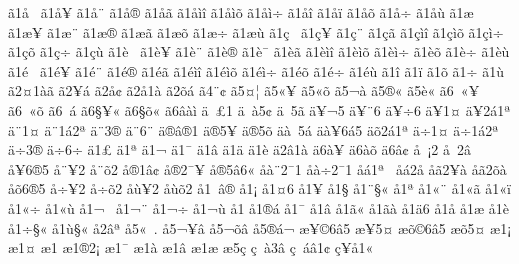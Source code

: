 {^^e31^^e5^^a0
^^e31^^e5^^a5
^^e31^^e5^^a8
^^e31^^e5^^ae
^^e31^^e5^^e3
^^e31^^e5^^ec^^ee
^^e31^^e5^^ec^^f5
^^e31^^e5^^ec^^f7
^^e31^^e5^^ee
^^e31^^e5^^ef
^^e31^^e5^^f5
^^e31^^e5^^f7
^^e31^^e5^^f9
^^e31^^e6^^a0
^^e31^^e6^^a5
^^e31^^e6^^a8
^^e31^^e6^^ae
^^e31^^e6^^e3
^^e31^^e6^^f5
^^e31^^e6^^f7
^^e31^^e6^^f9
^^e31^^e7^^a0
^^e31^^e7^^a5
^^e31^^e7^^a8
^^e31^^e7^^e3
^^e31^^e7^^ec^^ee
^^e31^^e7^^ec^^f5
^^e31^^e7^^ec^^f7
^^e31^^e7^^f5
^^e31^^e7^^f7
^^e31^^e7^^f9
^^e31^^e8^^a0
^^e31^^e8^^a5
^^e31^^e8^^a8
^^e31^^e8^^ae
^^e31^^e8^^af
^^e31^^e8^^e3
^^e31^^e8^^ec^^ee
^^e31^^e8^^ec^^f5
^^e31^^e8^^ec^^f7
^^e31^^e8^^f5
^^e31^^e8^^f7
^^e31^^e8^^f9
^^e31^^e9^^a0
^^e31^^e9^^a5
^^e31^^e9^^a8
^^e31^^e9^^ae
^^e31^^e9^^e3
^^e31^^e9^^ec^^ee
^^e31^^e9^^ec^^f5
^^e31^^e9^^ec^^f7
^^e31^^e9^^f5
^^e31^^e9^^f7
^^e31^^e9^^f9
^^e31^^ee
^^e31^^ef
^^e31^^f5
^^e31^^f7
^^e31^^f9
^^e32^^a41^^e0^^e3
^^e32^^a5^^e1
^^e32^^e5^^a2
^^e32^^e51^^e0
^^e32^^f5^^e1
^^e34^^ad^^a8^^a2
^^e35^^a4^^a6
^^e35^^ab^^a5
^^e35^^ab^^f5
^^e35^^ac^^e0
^^e35^^ae^^ab
^^e35^^e8^^ab
^^e36^^a0^^ab^^a5
^^e36^^a0^^ab^^f5
^^e36^^a0^^e1
^^e36^^a7^^a5^^ab
^^e36^^a7^^f5^^ab
^^e36^^e2^^e0^^ec
^^e4^^a0^^a31^^ad
^^e4^^a0^^e05^^a2
^^e4^^a05^^e3
^^e4^^a5^^ac5^^ad
^^e4^^a5^^ad^^a86
^^e4^^a5^^ad^^f76
^^e4^^a51^^a4
^^e4^^a52^^e11^^aa
^^e4^^a81^^a4
^^e4^^a81^^e12^^aa
^^e4^^a83^^ae
^^e4^^a86^^ad^^a8^^ad
^^e4^^ae^^e2^^ae1
^^e4^^ae5^^a5
^^e4^^ae5^^f5
^^e4^^e0^^a05^^e1
^^e4^^e0^^a56^^e15
^^e4^^f52^^e11^^aa
^^e4^^f71^^a4
^^e4^^f71^^e12^^aa
^^e4^^f73^^ae
^^e4^^f76^^ad^^f7^^ad
^^e41^^a3
^^e41^^aa
^^e41^^ac
^^e41^^af
^^e41^^e2
^^e41^^e4
^^e41^^e8
^^e42^^e21^^e0
^^e46^^e0^^a5
^^e46^^e0^^f5
^^e46^^e2^^a2
^^e5^^a0^^a12
^^e5^^a02^^e2
^^e5^^a56^^ae5
^^e5^^a8^^a52
^^e5^^a8^^f52
^^e5^^ae1^^e2^^a2
^^e5^^ae2^^af^^a5
^^e5^^ae5^^e26^^ab
^^e5^^e0^^a82^^af1
^^e5^^e0^^f72^^af1
^^e5^^e11^^aa^^a0
^^e5^^e12^^e5
^^e5^^e32^^a5^^e0
^^e5^^e32^^f5^^e0
^^e5^^f56^^ae5
^^e5^^f7^^a52
^^e5^^f7^^f52
^^e5^^f9^^a52
^^e5^^f9^^f52
^^e51^^a0^^e2^^ae
^^e51^^a1
^^e51^^a46
^^e51^^a5
^^e51^^a7
^^e51^^a8^^a7^^ab
^^e51^^aa
^^e51^^ab^^a8
^^e51^^ab^^e3
^^e51^^ab^^ef
^^e51^^ab^^f7
^^e51^^ab^^f9
^^e51^^ac^^a0
^^e51^^ac^^a8
^^e51^^ac^^f7
^^e51^^ac^^f9
^^e51^^ad
^^e51^^ae^^e1^^ad
^^e51^^af
^^e51^^e2
^^e51^^e3^^ab
^^e51^^e3^^e0
^^e51^^e46
^^e51^^e5
^^e51^^e6
^^e51^^e8
^^e51^^f7^^a7^^ab
^^e51^^f9^^a7^^ab
^^e52^^e2^^aa
^^e55^^ab^^a0.
^^e55^^ac^^a5^^e2
^^e55^^ac^^f5^^e2
^^e55^^ae^^e1^^ac
^^e6^^a5^^a96^^e25
^^e6^^a55^^a4
^^e6^^f5^^a96^^e25
^^e6^^f55^^a4
^^e61^^a1
^^e61^^a4
^^e61^^ad
^^e61^^ae2^^a1
^^e61^^af
^^e61^^e0
^^e61^^e2
^^e61^^e6
^^e65^^e7
^^e7^^a0^^e03^^e2
^^e7^^a0^^e1^^e21^^a2
^^e7^^a5^^e51^^ab
}
